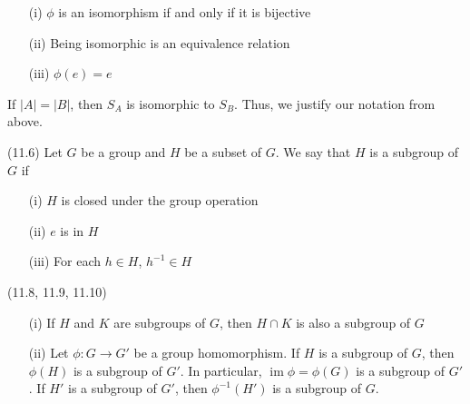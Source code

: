 \vspace{2ex}
\begin{rmk}
\begin{itemize}
\item[(i)] $\phi $ is an isomorphism if and only if it is bijective
\item[(ii)] Being isomorphic is an equivalence relation
\item[(iii)] $\phi (e)=e$
\end{itemize}
\end{rmk}
\vspace{2ex}
\vspace{2ex}
\begin{rmk}
If $|A|=|B|$, then $S_{A}$ is isomorphic to $S_{B}$. Thus, we justify our notation from above.
\end{rmk}
\vspace{2ex}
\begin{defi}
(11.6) Let $G$ be a group and $H$ be a subset of $G$. We say that $H$ is a subgroup of $G$ if
\begin{itemize}
\item[(i)] $H$ is closed under the group operation
\item[(ii)] $e$ is in $H$
\item[(iii)] For each $h\in H$, $h^{-1}\in H$
\end{itemize}
\end{defi}
\vspace{2ex}
\begin{ex}
(11.8, 11.9, 11.10)
\begin{itemize}
\item[(i)] If $H$ and $K$ are subgroups of $G$, then $H\cap K$ is also a subgroup of $G$ 
\item[(ii)] Let $\phi :G\rightarrow G'$ be a group homomorphism. If $H$ is a subgroup of $G$, then $\phi (H)$ is a subgroup of $G'$. In particular, $\mathop{\mathrm{im}}\phi =\phi (G)$ is a subgroup of $G'$. If $H'$ is a subgroup of $G'$, then $\phi ^{-1}(H')$ is a subgroup of $G$. 
\end{itemize}
\end{ex}
\vspace{2ex}
